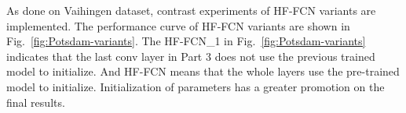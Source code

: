  As done on Vaihingen dataset, contrast experiments of HF-FCN variants are implemented. The performance curve of HF-FCN variants are shown in Fig.~\ref{fig:Potsdam-variants}.
 The HF-FCN\_1 in Fig.~\ref{fig:Potsdam-variants} indicates that the last conv layer in Part 3 does not use the previous trained model to initialize. And HF-FCN means that the whole layers use the pre-trained model to initialize. Initialization of parameters has a greater promotion on the final results.

